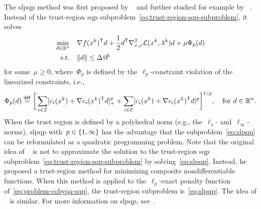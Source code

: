 The \gls{slpqp} method was first proposed by \citeauthor{Fletcher_1982a}~\cite{Fletcher_1982a} and further studied for example by \citeauthor{Yuan_1995}~\cite{Yuan_1995}.
Instead of the trust-region \gls{sqp} subproblem~\cref{eq:trust-region-sqp-subproblem}, it solves
\begin{subequations}
    \label{eq:slpqp}
    \begin{align}
        \min_{\step \in \R^n}   & \quad \nabla \obj(\iter[k])^{\T} \step + \frac{1}{2} \step^{\T} \nabla_{x, x}^2 \lag(\iter[k], \lm[k]) \step + \mu \Phi_p(\step)\\
        \text{s.t.}             & \quad \norm{\step} \le \rad[k]
    \end{align}
\end{subequations}
for some~$\mu \ge 0$, where~$\Phi_p$ is defined by the~$\ell_p$-constraint violation of the linearized constraints, i.e.,
\begin{equation*}
    \Phi_p(d) \eqdef \bigg[ \sum_{i \in \iub} \posp{\con{i}(\iter[k]) + \nabla \con{i}(\iter[k])^{\T} \step}^p + \sum_{i \in \ieq} \abs{\con{i}(\iter[k]) + \nabla \con{i}(\iter[k])^{\T} \step}^p \bigg]^{1/p}, \quad \text{for~$d \in \R^n$.}
\end{equation*}
When the trust region is defined by a polyhedral norm (e.g., the~$\ell_1$- and~$\ell_{\infty}$-norms), \gls{slpqp} with~$p \in \{1, \infty\}$ has the advantage that the subproblem~\cref{eq:slpqp} can be reformulated as a quadratic programming problem.
Note that the original idea of \citeauthor{Fletcher_1982a}~\cite{Fletcher_1982a} is not to approximate the solution to the trust-region \gls{sqp} subproblem~\cref{eq:trust-region-sqp-subproblem} by solving~\cref{eq:slpqp}.
Instead, he proposed a trust-region method for minimizing composite nondifferentiable functions.
When this method is applied to the~$\ell_p$-exact penalty function of~\cref{eq:problem-cobyqa-sqp}, the trust-region subproblem is~\cref{eq:slpqp}.
The idea of \citeauthor{Yuan_1995}~\cite{Yuan_1995} is similar.
For more information on \gls{slpqp}, see~\cite[\S~8.4.1]{Gould_2021}.

